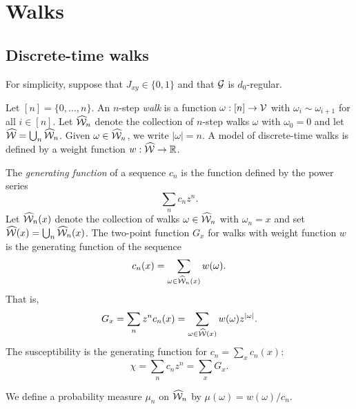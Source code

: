 
\section{Walks}

\subsection{Discrete-time walks}

For simplicity, suppose that $J_{xy} \in \{ 0, 1 \}$ and that $\mathcal{G}$ is
$d_0$-regular.

Let $[n] = \{ 0, \ldots, n \}$.
An $n$-step \emph{walk} is a function $\omega : [n] \rightarrow \mathcal{V}$ with
$\omega_i \sim \omega_{i+1}$ for all $i \in [n]$. Let $\widehat{\mathcal{W}}_n$ denote the collection
of $n$-step walks $\omega$ with $\omega_0 = 0$ and let $\widehat{\mathcal{W}} = \bigcup_n \widehat{\mathcal{W}}_n$.
Given $\omega\in\widehat{\mathcal{W}}_n$, we write $|\omega| = n$.
A model of discrete-time walks is defined by a weight function $w : \widehat{\mathcal{W}} \rightarrow {\mathbb R}$.

The \emph{generating function} of a sequence $c_n$ is the function defined by
the power series
\begin{equation}
\sum_n c_n z^n.
\end{equation}
Let $\widehat{\mathcal{W}}_n(x)$ denote the collection of walks $\omega\in\widehat{\mathcal{W}}_n$ with $\omega_n = x$
and set $\widehat{\mathcal{W}}(x) = \bigcup_n \widehat{\mathcal{W}}_n(x)$.
The two-point function $G_x$ for walks with weight function $w$ is the generating
function of the sequence
\begin{equation}
c_n(x) = \sum_{\omega\in\widehat{\mathcal{W}}_n(x)} w(\omega).
\end{equation}
That is,
\begin{equation}
G_x = \sum_n z^n c_n(x)
	= \sum_{\omega\in\widehat{\mathcal{W}}(x)} w(\omega) z^{|\omega|}.
\end{equation}
The susceptibility is the generating function for $c_n = \sum_x c_n(x)$:
\begin{equation}
\chi = \sum_n c_n z^n = \sum_x G_x.
\end{equation}

We define a probability measure $\mu_n$ on $\widehat{\mathcal{W}}_n$ by $\mu(\omega) = w(\omega) / c_n$.


